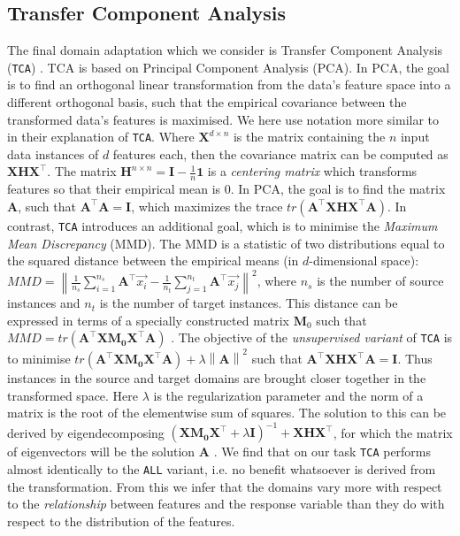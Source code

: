 \documentclass{article}
\begin{document}
\subsection{Transfer Component Analysis}

The final domain adaptation which we consider is Transfer Component Analysis (\texttt{TCA}) \citep{tca}. TCA is based on Principal Component Analysis (PCA). In PCA, the goal is to find an orthogonal linear transformation from the data's feature space into a different orthogonal basis, such that the empirical covariance between the transformed data's features is maximised. We here use notation more similar to \cite{jda} in their explanation of \texttt{TCA}. Where \(\mathbf{X}^{d \times n}\) is the matrix containing the \(n\) input data instances of \(d\) features each, then the covariance matrix can be computed as \(\mathbf{X}\mathbf{H}\mathbf{X}^{\top}\). The matrix \(\mathbf{H}^{n \times n} = \mathbf{I} - \frac{1}{n}\mathbf{1}\) is a \textit{centering matrix} which transforms features so that their empirical mean is 0. In PCA, the goal is to find the matrix \(\mathbf{A}\), such that \(\mathbf{A}^{\top}\mathbf{A} = \mathbf{I}\), which maximizes the trace \( tr(\mathbf{A}^{\top}\mathbf{X}\mathbf{H}\mathbf{X}^{\top}\mathbf{A}) \). In contrast, \texttt{TCA} introduces an additional goal, which is to minimise the \textit{Maximum Mean Discrepancy} (MMD). The MMD is a statistic of two distributions equal to the squared distance between the empirical means (in \(d\)-dimensional space): \(MMD = \left\| \frac{1}{n_s} \sum_{i=1}^{n_s}\mathbf{A}^{\top}\vec{x_i} - \frac{1}{n_t}\sum_{j=1}^{n_t}\mathbf{A}^{\top}\vec{x_j}\right\|^2 \), where \(n_s\) is the number of source instances and \(n_t\) is the number of target instances. This distance can be expressed in terms of a specially constructed matrix \(\mathbf{M}_0\) such that \(MMD = tr(\mathbf{A}^{\top}\mathbf{X}\mathbf{M_0}\mathbf{X}^{\top}\mathbf{A})\) \citep{jda}. The objective of the \textit{unsupervised variant} of \texttt{TCA} is to minimise \(tr(\mathbf{A}^{\top}\mathbf{X}\mathbf{M_0}\mathbf{X}^{\top}\mathbf{A}) + \lambda \left\| \mathbf{A} \right\|^2 \) such that \(\mathbf{A}^{\top}\mathbf{X}\mathbf{H}\mathbf{X}^{\top}\mathbf{A} = \mathbf{I} \). Thus instances in the source and target domains are brought closer together in the transformed space. Here \(\lambda\) is the regularization parameter and the norm of a matrix is the root of the elementwise sum of squares. The solution to this can be derived by eigendecomposing \((\mathbf{X}\mathbf{M_0}\mathbf{X}^{\top} + \lambda\mathbf{I})^{-1} + \mathbf{X}\mathbf{H}\mathbf{X}^{\top}\), for which the matrix of eigenvectors will be the solution \(\mathbf{A}\) \cite{tca} \cite{jda}. We find that on our task \texttt{TCA} performs almost identically to the \texttt{ALL} variant, i.e. no benefit whatsoever is derived from the transformation. From this we infer that the domains vary more with respect to the \textit{relationship} between features and the response variable than they do with respect to the distribution of the features.
\end{document}
